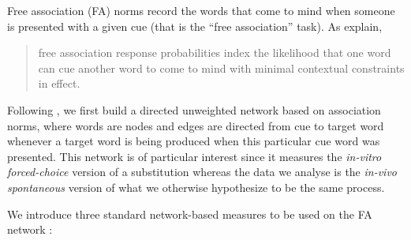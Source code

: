 Free association (FA) norms record the words that come to mind when someone is presented with a given cue (that is the ``free association'' task).
As \citeauthor{Nelson04} explain,
\begin{quote}
free association response probabilities index the likelihood that one word can cue another word to come to mind with minimal contextual constraints in effect.~\citep{Nelson04}
\end{quote}
Following \citet{Griffiths07}, we first build a directed unweighted network based on association norms, where words are nodes and edges are directed from cue to target word whenever a target word is being produced when this particular cue word was presented.
This network is of particular interest since it measures the \emph{in-vitro forced-choice} version of a substitution whereas the data we analyse is the \emph{in-vivo spontaneous} version of what we otherwise hypothesize to be the same process.

\bigskip
We introduce three standard network-based measures to be used on the FA network%
:

